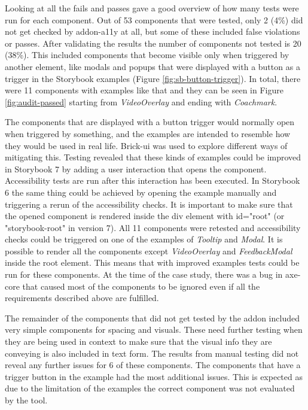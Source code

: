 \documentclass{master_thesis}
\begin{document}
Looking at all the fails and passes gave a good overview of how many tests were run for each component. Out of 53 components that were tested, only 2 (4\%) did not get checked by addon-a11y at all, but some of these included false violations or passes. After validating the results the number of components not tested is 20 (38\%). This included components that become visible only when triggered by another element, like modals and popups that were displayed with a button as a trigger in the Storybook examples (Figure \ref{fig:sb-button-trigger}). In total, there were 11 components with examples like that and they can be seen in Figure \ref{fig:audit-passed} starting from \textit{VideoOverlay} and ending with \textit{Coachmark}.

The components that are displayed with a button trigger would normally open when triggered by something, and the examples are intended to resemble how they would be used in real life. Brick-ui was used to explore different ways of mitigating this. Testing revealed that these kinds of examples could be improved in Storybook 7 by adding a user interaction that opens the component. Accessibility tests are run after this interaction has been executed. In Storybook 6 the same thing could be achieved by opening the example manually and triggering a rerun of the accessibility checks. It is important to make sure that the opened component is rendered inside the div element with id="root" (or "storybook-root" in version 7). All 11 components were retested and accessibility checks could be triggered on one of the examples of \textit{Tooltip} and \textit{Modal}. It is possible to render all the components except \textit{VideoOverlay} and \textit{FeedbackModal} inside the root element. This means that with improved examples tests could be run for these components. At the time of the case study, there was a bug in axe-core that caused most of the components to be ignored even if all the requirements described above are fulfilled.

The remainder of the components that did not get tested by the addon included very simple components for spacing and visuals. These need further testing when they are being used in context to make sure that the visual info they are conveying is also included in text form. The results from manual testing did not reveal any further issues for 6 of these components. The components that have a trigger button in the example had the most additional issues. This is expected as due to the limitation of the examples the correct component was not evaluated by the tool.
\end{document}

